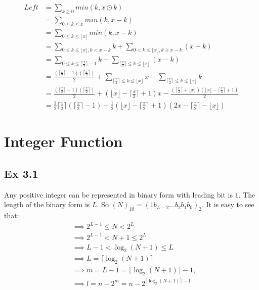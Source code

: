 \documentclass{article}
\begin{document}
\begin{equation}
    \begin{split}
        Left & = \sum_{k\ge 0} min(k, x \odot k)\\
             & = \sum_{0 \le k \le x} min(k, x - k)\\
             & = \sum_{0 \le k \le \lfloor x \rfloor} min(k, x - k)\\
             & = \sum_{0 \le k \le \lfloor x \rfloor, k < x - k} k + \sum_{0 < k \le \lfloor x \rfloor, k \ge x - k}(x-k)\\
             & = \sum_{0 \le k \le \lceil \frac{x}{2} \rceil-1}k + \sum_{\lceil \frac{x}{2} \rceil \le k \le \lfloor x \rfloor}(x-k)\\
             & = \frac{(\lceil \frac{x}{2} \rceil-1)(\lceil \frac{x}{2} \rceil)}{2} + \sum_{\lceil \frac{x}{2} \rceil \le k \le \lfloor x \rfloor}x - \sum_{\lceil \frac{x}{2} \rceil \le k \le \lfloor x \rfloor}k\\
             & = \frac{(\lceil \frac{x}{2} \rceil-1)(\lceil \frac{x}{2} \rceil)}{2} + (\lfloor x \rfloor - \lceil \frac{x}{2} \rceil + 1)x - \frac{(\lceil \frac{x}{2} \rceil + \lfloor x \rfloor)(\lfloor x \rfloor -  \lceil \frac{x}{2} \rceil + 1)}{2}\\
             & = \frac{1}{2}\lceil \frac{x}{2} \rceil (\lceil \frac{x}{2} \rceil - 1) + \frac{1}{2}(\lfloor x \rfloor - \lceil \frac{x}{2} \rceil + 1)(2x - \lceil \frac{x}{2} \rceil - \lfloor x \rfloor)
    \end{split}
\end{equation}

\section{Integer Function}

\subsection{Ex 3.1}

Any positive integer can be represented in binary form with leading bit is $1$. The length of the binary form is $L$. So $(N)_{10} = (1b_{L-2}\dots b_2b_1b_0)_{2}$. It is easy to see that:
\begin{equation}
    \begin{split}
        & \implies  2^{L-1} \le N < 2^{L}\\
        & \implies  2^{L-1} < N+1 \le 2^{L}\\
        & \implies  L-1 < \log_2(N+1) \le L\\
        & \implies  L = \lceil \log_2(N+1) \rceil\\
        & \implies  m = L-1 = \lceil \log_2(N+1) \rceil - 1, \\
        & \implies l = n - 2^m = n - 2^{\lceil \log_2(N+1) \rceil - 1}
    \end{split}
\end{equation}
\end{document}
